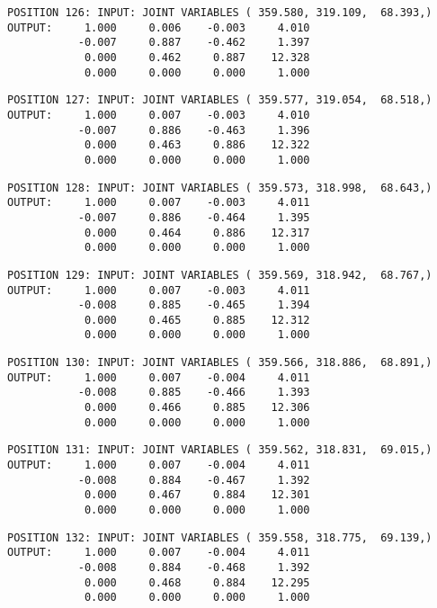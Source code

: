 \begin{verbatim}
POSITION 126: INPUT: JOINT VARIABLES ( 359.580, 319.109,  68.393,)
OUTPUT:     1.000     0.006    -0.003     4.010
           -0.007     0.887    -0.462     1.397
            0.000     0.462     0.887    12.328
            0.000     0.000     0.000     1.000
\end{verbatim} \pagebreak[1]\begin{verbatim}
POSITION 127: INPUT: JOINT VARIABLES ( 359.577, 319.054,  68.518,)
OUTPUT:     1.000     0.007    -0.003     4.010
           -0.007     0.886    -0.463     1.396
            0.000     0.463     0.886    12.322
            0.000     0.000     0.000     1.000
\end{verbatim} \pagebreak[1]\begin{verbatim}
POSITION 128: INPUT: JOINT VARIABLES ( 359.573, 318.998,  68.643,)
OUTPUT:     1.000     0.007    -0.003     4.011
           -0.007     0.886    -0.464     1.395
            0.000     0.464     0.886    12.317
            0.000     0.000     0.000     1.000
\end{verbatim} \pagebreak[1]\begin{verbatim}
POSITION 129: INPUT: JOINT VARIABLES ( 359.569, 318.942,  68.767,)
OUTPUT:     1.000     0.007    -0.003     4.011
           -0.008     0.885    -0.465     1.394
            0.000     0.465     0.885    12.312
            0.000     0.000     0.000     1.000
\end{verbatim} \pagebreak[1]\begin{verbatim}
POSITION 130: INPUT: JOINT VARIABLES ( 359.566, 318.886,  68.891,)
OUTPUT:     1.000     0.007    -0.004     4.011
           -0.008     0.885    -0.466     1.393
            0.000     0.466     0.885    12.306
            0.000     0.000     0.000     1.000
\end{verbatim} \pagebreak[1]\begin{verbatim}
POSITION 131: INPUT: JOINT VARIABLES ( 359.562, 318.831,  69.015,)
OUTPUT:     1.000     0.007    -0.004     4.011
           -0.008     0.884    -0.467     1.392
            0.000     0.467     0.884    12.301
            0.000     0.000     0.000     1.000
\end{verbatim} \pagebreak[1]\begin{verbatim}
POSITION 132: INPUT: JOINT VARIABLES ( 359.558, 318.775,  69.139,)
OUTPUT:     1.000     0.007    -0.004     4.011
           -0.008     0.884    -0.468     1.392
            0.000     0.468     0.884    12.295
            0.000     0.000     0.000     1.000
\end{verbatim} \pagebreak[1]\begin{verbatim}

\end{verbatim}
